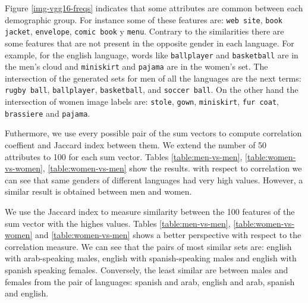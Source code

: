 \documentclass[runningheads]{llncs}
\begin{document}
Figure \ref{img-vgg16-freqs} indicates that some attributes
are common between each demographic group. For instance
some of these features are: \texttt{web site}, \texttt{book jacket}, \texttt{envelope}, \texttt{comic book} y \texttt{menu}. Contrary to the similarities there are 
some features that are not present in the opposite 
gender in each language. For example, for the english
language, words like 
\texttt{ballplayer} and \texttt{basketball} 
are in the men's cloud and \texttt{miniskirt} and
\texttt{pajama} are in the women's set. 
The intersection of the generated sets
for men of all the languages are the next terms:
\texttt{rugby ball}, \texttt{ballplayer}, \texttt{basketball}, and \texttt{soccer ball}.
On the other hand the intersection of women image labels
are: \texttt{stole}, \texttt{gown}, \texttt{miniskirt}, \texttt{fur coat}, \texttt{brassiere} and \texttt{pajama}.

Futhermore, we use every possible pair of the sum vectors
to compute correlation coeffient and Jaccard index between 
them. We extend the number of 50 attributes to 100 for
each sum vector. Tables \ref{table:men-vs-men}, \ref{table:women-vs-women}, \ref{table:women-vs-men} show
the results.
with respect to correlation we can see that same genders of 
different languages had very high values. However, 
a similar result is obtained between men and women.



We use the Jaccard index to measure similarity between the
100 features of the sum vector with the highes values.
Tables \ref{table:men-vs-men}, \ref{table:women-vs-women} and \ref{table:women-vs-men} shows a better perspective with respect to the correlation measure. We can see
that the pairs of most similar sets are: english with arab-speaking males, english with spanish-speaking males
and  english with spanish speaking females. Conversely, 
the least similar are between males and females
from the pair of languages: spanish and arab, english and arab, spanish and english.
%
%
%
\end{document}
